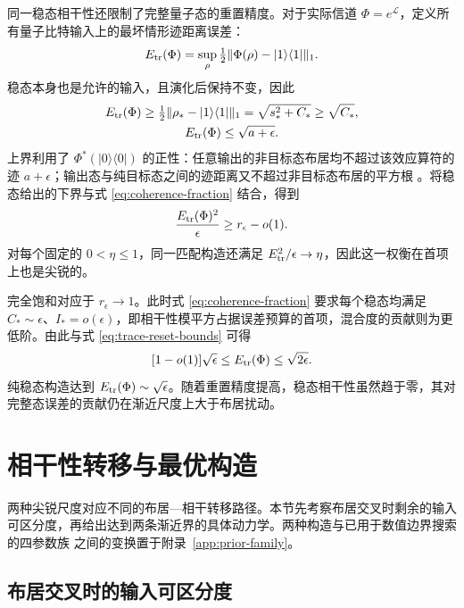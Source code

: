 \documentclass[aps,pra,reprint,amsmath,amssymb,nofootinbib,floatfix,longbibliography]{revtex4-2}
\theoremstyle{aps}
\newcommand{\eps}{\epsilon}
\newcommand{\proj}[1]{|#1\rangle\langle#1|}
\begin{document}
同一稳态相干性还限制了完整量子态的重置精度。对于实际信道 $\Phi=e^{\mathcal L}$，定义所有量子比特输入上的最坏情形迹距离误差：
\begin{equation}\label{eq:trace-reset-error}
 E_{\rm tr}(\Phi)=\sup_\rho\tfrac12\|\Phi(\rho)-\proj1\|_1.
\end{equation}
稳态本身也是允许的输入，且演化后保持不变，因此
\begin{equation}\label{eq:trace-reset-bounds}
 \begin{gathered}
 E_{\rm tr}(\Phi)\ge\tfrac12\|\rho_*-\proj1\|_1
 =\sqrt{s_*^2+C_*}\ge\sqrt{C_*},\\
 E_{\rm tr}(\Phi)\le\sqrt{a+\eps}.
 \end{gathered}
\end{equation}
上界利用了 $\Phi^*(\proj0)$ 的正性：任意输出的非目标态布居均不超过该效应算符的迹 $a+\eps$；输出态与纯目标态之间的迹距离又不超过非目标态布居的平方根 \cite{FuchsVanDeGraaf1999}。将稳态给出的下界与式 \eqref{eq:coherence-fraction} 结合，得到
\begin{equation}\label{eq:population-state-tradeoff}
 \frac{E_{\rm tr}(\Phi)^2}{\eps}\ge r_\eps-o(1).
\end{equation}
对每个固定的 $0<\eta\le1$，同一匹配构造还满足 $E_{\rm tr}^2/\eps\to\eta$，因此这一权衡在首项上也是尖锐的。

完全饱和对应于 $r_\eps\to1$。此时式 \eqref{eq:coherence-fraction} 要求每个稳态均满足 $C_*\sim\eps$、$I_*=o(\eps)$，即相干性模平方占据误差预算的首项，混合度的贡献则为更低阶。由此与式 \eqref{eq:trace-reset-bounds} 可得
\begin{equation}\label{eq:saturation-trace-cost}
 [1-o(1)]\sqrt\eps\le E_{\rm tr}(\Phi)\le\sqrt{2\eps}.
\end{equation}
纯稳态构造达到 $E_{\rm tr}(\Phi)\sim\sqrt\eps$。随着重置精度提高，稳态相干性虽然趋于零，其对完整态误差的贡献仍在渐近尺度上大于布居扰动。

\section{相干性转移与最优构造}\label{sec:mechanisms}

两种尖锐尺度对应不同的布居—相干转移路径。本节先考察布居交叉时剩余的输入可区分度，再给出达到两条渐近界的具体动力学。两种构造与已用于数值边界搜索的四参数族 \cite{Shahbeigi2024} 之间的变换置于附录~\ref{app:prior-family}。

\subsection{布居交叉时的输入可区分度}
\end{document}
